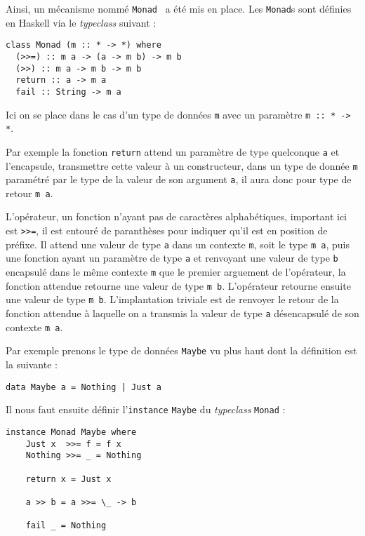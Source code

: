 \documentclass{llncs}
\begin{document}
Ainsi, un mécanisme nommé \lstinline{Monad}~\cite{Wadler90} a été mis en place.
Les \lstinline{Monad}s sont définies en Haskell via le \emph{typeclass} suivant :
\begin{lstlisting}
class Monad (m :: * -> *) where
  (>>=) :: m a -> (a -> m b) -> m b
  (>>) :: m a -> m b -> m b
  return :: a -> m a
  fail :: String -> m a
\end{lstlisting}

Ici on se place dans le cas d'un type de données \lstinline{m} avec un paramètre
\lstinline{m :: * -> *}.

Par exemple la fonction \lstinline{return} attend un paramètre de type quelconque
\lstinline{a} et l'encapsule, transmettre cette valeur à un constructeur, dans
un type de donnée \lstinline{m} paramétré par le type de la valeur de son argument
\lstinline{a}, il aura donc pour type de retour \lstinline{m a}.

L'opérateur, un fonction n'ayant pas de caractères alphabétiques, important ici
est \lstinline{>>=}, il est entouré de paranthèses pour indiquer qu'il est en
position de préfixe.
Il attend une valeur de type \lstinline{a} dans un contexte \lstinline{m}, soit
le type \lstinline{m a}, puis une fonction ayant un paramètre de type \lstinline{a}
et renvoyant une valeur de type \lstinline{b} encapsulé dans le même contexte \lstinline{m}
que le premier arguement de l'opérateur, la fonction attendue retourne
une valeur de type \lstinline{m b}. L'opérateur retourne ensuite une valeur de
type \lstinline{m b}.
L'implantation triviale est de renvoyer le retour de la fonction attendue à
laquelle on a transmis la valeur de type \lstinline{a} désencapsulé de son contexte
\lstinline{m a}.

Par exemple prenons le type de données \lstinline{Maybe} vu plus haut dont la définition
est la suivante :
\begin{lstlisting}
data Maybe a = Nothing | Just a
\end{lstlisting}

Il nous faut ensuite définir l'\lstinline{instance} \lstinline{Maybe} du \emph{typeclass}
\lstinline{Monad} :
\begin{lstlisting}
instance Monad Maybe where
    Just x  >>= f = f x
    Nothing >>= _ = Nothing

    return x = Just x

    a >> b = a >>= \_ -> b

    fail _ = Nothing
\end{lstlisting}
\end{document}
